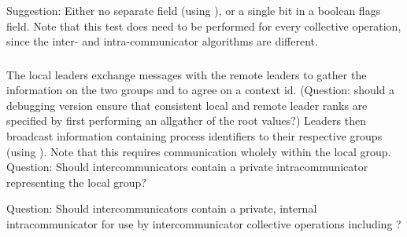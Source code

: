 \documentclass{article}
\begin{document}
Suggestion: Either no separate field (using
 \code{==}
), or a single bit in a boolean flags field.  
Note that this test does need to be performed for every collective operation,
since the inter- and intra-communicator algorithms are different.

\subsubsection{}
The local leaders exchange messages with the remote leaders to gather the
information on the two groups and to agree on a context id.  (Question: should
a debugging version ensure 
that consistent local and remote leader ranks are specified by first
performing an allgather of the root values?)  
Leaders then broadcast information containing process identifiers to
their respective groups (using 
). Note that this requires communication wholely
within the local group.  Question: Should intercommunicators contain a
private intracommunicator representing the local group?

Question:  Should intercommunicators contain a private, internal
intracommunicator for use by intercommunicator collective operations including
?
\end{document}

